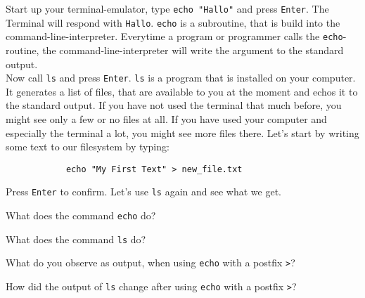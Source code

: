 \begin{challenge}
    \begin{task}
        Start up your terminal-emulator, type \texttt{echo "Hallo"} and press \texttt{Enter}.
        The Terminal will respond with \texttt{Hallo}.
        \texttt{echo} is a subroutine, that is build into the command-line-interpreter.
        Everytime a program or programmer calls the \texttt{echo}-routine, the command-line-interpreter will write the argument to the standard output.\\
        Now call \texttt{ls} and press \texttt{Enter}.
        \texttt{ls} is a program that is installed on your computer.
        It generates a list of files, that are available to you at the moment and echos it to the standard output.
        If you have not used the terminal that much before, you might see only a few or no files at all. 
        If you have used your computer and especially the terminal a lot, you might see more files there. 
        Let's start by writing some text to our filesystem by typing:
        \begin{lstlisting}
            echo "My First Text" > new_file.txt 
        \end{lstlisting}
        Press \texttt{Enter} to confirm.
        Let's use \texttt{ls} again and see what we get.

        \begin{quesitons}
            \item What does the command \texttt{echo} do?
            \item What does the command \texttt{ls} do?
            \item What do you observe as output, when using \texttt{echo} with a postfix \texttt{>}?
            \item How did the output of \texttt{ls} change after using \texttt{echo} with a postfix \texttt{>}?
        \end{quesitons}
    \end{task}


\end{challenge}
